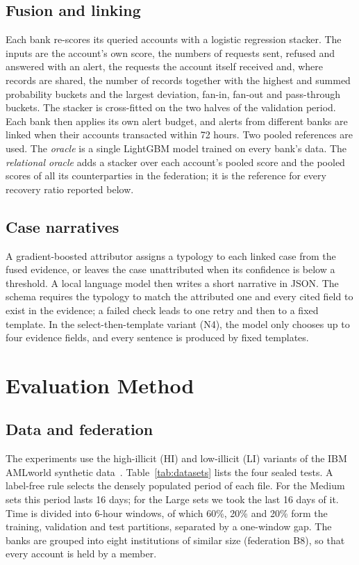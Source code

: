 \documentclass[conference]{IEEEtran}
\begin{document}
\subsection{Fusion and linking}
Each bank re-scores its queried accounts with a logistic regression stacker. The inputs are
the account's own score, the numbers of requests sent, refused and answered with an alert,
the requests the account itself received and, where records are shared, the number of
records together with the highest and summed probability buckets and the largest deviation,
fan-in, fan-out and pass-through buckets. The stacker is cross-fitted on the two halves of
the validation period. Each bank then applies its own alert budget, and alerts from
different banks are linked when their accounts transacted within 72 hours. Two pooled
references are used. The \emph{oracle} is a single LightGBM model trained on every bank's
data. The \emph{relational oracle} adds a stacker over each account's pooled score and the
pooled scores of all its counterparties in the federation; it is the reference for every
recovery ratio reported below.

\subsection{Case narratives}
A gradient-boosted attributor assigns a typology to each linked case from the fused
evidence, or leaves the case unattributed when its confidence is below a threshold. A local
language model then writes a short narrative in JSON. The schema requires the typology to
match the attributed one and every cited field to exist in the evidence; a failed check
leads to one retry and then to a fixed template. In the select-then-template variant (N4),
the model only chooses up to four evidence fields, and every sentence is produced by fixed
templates.

\section{Evaluation Method}\label{sec:method}

\subsection{Data and federation}
The experiments use the high-illicit (HI) and low-illicit (LI) variants of the IBM AMLworld
synthetic data~\cite{altman2023}. Table~\ref{tab:datasets} lists the four sealed tests. A
label-free rule selects the densely populated period of each file. For the Medium sets this
period lasts 16 days; for the Large sets we took the last 16 days of it. Time is divided into
6-hour windows, of which 60\%, 20\% and 20\% form the training, validation and test
partitions, separated by a one-window gap. The banks are grouped into eight institutions of
similar size (federation B8), so that every account is held by a member.
\end{document}
